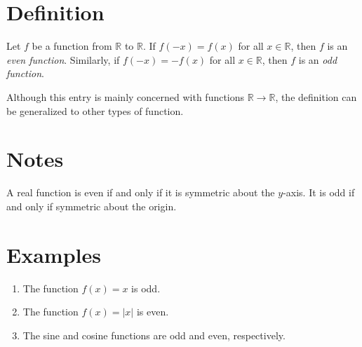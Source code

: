 \documentclass[12pt]{article}
\newcommand{\sR}[0]{\mathbb{R}}
\begin{document}

\section*{Definition}
Let $f$ be a function from $\sR$ to $\sR$. 
If $f(-x)=f(x)$ for all $x\in \sR$, 
then $f$ is an \emph{even function}.
Similarly, 
if $f(-x)=-f(x)$ for all $x\in \sR$, 
then $f$ is an \emph{odd function}.

Although this entry is mainly concerned with functions $\sR\to\sR$,
the definition can be generalized to other types of function.

\section*{Notes}
A real function is even if and only if it is symmetric about the $y$-axis.
It is odd if and only if symmetric about the origin.

\section*{Examples}
\begin{enumerate}
\item The function $f(x)=x$ is odd.
\item The function $f(x)=|x|$ is even.
\item The sine and cosine functions are odd and even, respectively.
\end{enumerate}
\end{document}
